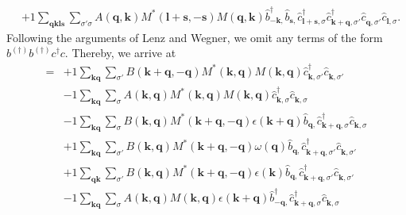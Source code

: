 \begin{align*}
	&+1 \sum_{ \mathbf{q} \mathbf{k} \mathbf{l} \mathbf{s} } \sum_{ \sigma' \sigma } A( \mathbf{q}, \mathbf{k} )  M^*( \mathbf{l}+\mathbf{s}, -\mathbf{s} )  M( \mathbf{q}, \mathbf{k} )   \hat{b}_{ -\mathbf{k}, }^\dagger  \hat{b}_{ \mathbf{s}, }^{\phantom{\dagger}} \hat{c}_{ \mathbf{l}+\mathbf{s}, \sigma }^\dagger  \hat{c}_{ \mathbf{k}+\mathbf{q}, \sigma' }^\dagger  \hat{c}_{ \mathbf{q}, \sigma' }^{\phantom{\dagger}} \hat{c}_{ \mathbf{l}, \sigma }^{\phantom{\dagger}} 
. \end{align*}
Following the arguments of Lenz and Wegner, we omit any terms of the form $b^{(\dagger)} b^{(\dagger)} c^\dagger c$. Thereby, we arrive at 
\begin{align*}
	[\eta, H] = 	&+1 \sum_{ \mathbf{k} \mathbf{q} } \sum_{ \sigma' } B( \mathbf{k}+\mathbf{q}, -\mathbf{q} )  M^*( \mathbf{k}, \mathbf{q} )  M( \mathbf{k}, \mathbf{q} )   \hat{c}_{ \mathbf{k}, \sigma' }^\dagger  \hat{c}_{ \mathbf{k}, \sigma' }^{\phantom{\dagger}}  \\
	&-1 \sum_{ \mathbf{k} \mathbf{q} } \sum_{ \sigma } A( \mathbf{k}, \mathbf{q} )  M^*( \mathbf{k}, \mathbf{q} )  M( \mathbf{k}, \mathbf{q} )   \hat{c}_{ \mathbf{k}, \sigma }^\dagger  \hat{c}_{ \mathbf{k}, \sigma }^{\phantom{\dagger}}  \\
	&-1 \sum_{ \mathbf{k} \mathbf{q} } \sum_{ \sigma } B( \mathbf{k}, \mathbf{q} )  M^*( \mathbf{k}+\mathbf{q}, -\mathbf{q} )  \epsilon( \mathbf{k}+\mathbf{q} )   \hat{b}_{ \mathbf{q}, }^{\phantom{\dagger}} \hat{c}_{ \mathbf{k}+\mathbf{q}, \sigma }^\dagger  \hat{c}_{ \mathbf{k}, \sigma }^{\phantom{\dagger}}  \\
	&+1 \sum_{ \mathbf{k} \mathbf{q} } \sum_{ \sigma' } B( \mathbf{k}, \mathbf{q} )  M^*( \mathbf{k}+\mathbf{q}, -\mathbf{q} )  \omega( \mathbf{q} )   \hat{b}_{ \mathbf{q}, }^{\phantom{\dagger}} \hat{c}_{ \mathbf{k}+\mathbf{q}, \sigma' }^\dagger  \hat{c}_{ \mathbf{k}, \sigma' }^{\phantom{\dagger}}  \\
	&+1 \sum_{ \mathbf{q} \mathbf{k} } \sum_{ \sigma' } B( \mathbf{k}, \mathbf{q} )  M^*( \mathbf{k}+\mathbf{q}, -\mathbf{q} )  \epsilon( \mathbf{k} )   \hat{b}_{ \mathbf{q}, }^{\phantom{\dagger}} \hat{c}_{ \mathbf{k}+\mathbf{q}, \sigma' }^\dagger  \hat{c}_{ \mathbf{k}, \sigma' }^{\phantom{\dagger}}  \\
	&-1 \sum_{ \mathbf{k} \mathbf{q} } \sum_{ \sigma } A( \mathbf{k}, \mathbf{q} )  M( \mathbf{k}, \mathbf{q} )  \epsilon( \mathbf{k}+\mathbf{q} )   \hat{b}_{ -\mathbf{q}, }^\dagger  \hat{c}_{ \mathbf{k}+\mathbf{q}, \sigma }^\dagger  \hat{c}_{ \mathbf{k}, \sigma }^{\phantom{\dagger}}  \\

\end{align*}
